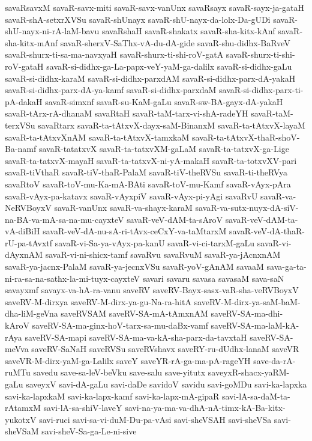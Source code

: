 {savaRsavxM
savaR-savx-miti
savaR-savx-vanUnx
savaRsayx
savaR-sayx-ja-gataH
savaR-shA-setxrXVSu
savaR-shUnayx
savaR-shU-nayx-da-lolx-Da-gUDi
savaR-shU-nayx-ni-rA-laM-bavu
savaRshaH
savaR-shakatx
savaR-sha-kitx-kAnf
savaR-sha-kitx-mAnf
savaR-sherxV-SaThx-vA-du-dA-gide
savaR-shu-didhx-BaRveV
savaR-shurx-ti-sa-ma-navxyaH
savaR-shurx-ti-shi-roV-gatA
savaR-shurx-ti-shi-roV-gataH
savaR-si-didhx-ga-La-papx-veY-yaM-ga-dalilx
savaR-si-didhx-gaLu
savaR-si-didhx-karaM
savaR-si-didhx-parxdAM
savaR-si-didhx-parx-dA-yakaH
savaR-si-didhx-parx-dA-ya-kamf
savaR-si-didhx-parxdaM
savaR-si-didhx-parx-ti-pA-dakaH
savaR-simxnf
savaR-su-KaM-gaLu
savaR-sw-BA-gayx-dA-yakaH
savaR-tArx-rA-dhanaM
savaRtaH
savaR-taM-tarx-vi-shA-radeYH
savaR-taM-terxVSu
savaRtarx
savaR-ta-tAtxvX-dayx-saM-BinanxM
savaR-ta-tAtxvX-layaM
savaR-ta-tAtxvXnAM
savaR-ta-tAtxvX-tamxkaM
savaR-ta-tAtxvX-thaR-shoV-Ba-namf
savaR-tatatxvX
savaR-ta-tatxvXM-gaLaM
savaR-ta-tatxvX-ga-Lige
savaR-ta-tatxvX-mayaH
savaR-ta-tatxvX-ni-yA-makaH
savaR-ta-totxvXV-pari
savaR-tiVthaR
savaR-tiV-thaR-PalaM
savaR-tiV-theRVSu
savaR-ti-theRVya
savaRtoV
savaR-toV-mu-Ka-mA-BAti
savaR-toV-mu-Kamf
savaR-vAyx-pAra
savaR-vAyx-pa-katavx
savaR-vAyxpiV
savaR-vAyx-pi-yAgi
savaRvU
savaR-va-NeRVBoyxV
savaR-vanUnx
savaR-va-shayx-karaM
savaR-va-sutx-nuyx-dA-siV-na-BA-va-mA-sa-na-mu-cayxteV
savaR-veV-dAM-ta-sAroV
savaR-veV-dAM-ta-vA-diBiH
savaR-veV-dA-nu-sA-ri-tAvx-ceCxY-va-taMtarxM
savaR-veV-dA-thaR-rU-pa-tAvxtf
savaR-vi-Sa-ya-vAyx-pa-kanU
savaR-vi-ci-tarxM-gaLu
savaR-vi-dAyxnAM
savaR-vi-ni-shicx-tamf
savaRvu
savaRvuM
savaR-ya-jAcnxnAM
savaR-ya-jacnx-PalaM
savaR-ya-jecnxVSu
savaR-yoV-gAnAM
savaaM
sava-ga-ta-ni-ra-sa-na-sathx-la-mi-tuyx-cayxteV
savari
savaru
savasa
savasaM
sava-saN
savayxmf
savayx-va-hA-ra-vanu
saveRV
saveRV-Bayx-sasx-vaR-sha-veRVBoyxV
saveRV-M-dirxya
saveRV-M-dirx-ya-gu-Na-ra-hitA
saveRV-M-dirx-ya-saM-baM-dha-liM-geVna
saveRVSAM
saveRV-SA-mA-tAmxnAM
saveRV-SA-ma-dhi-kAroV
saveRV-SA-ma-ginx-hoV-tarx-sa-mu-daBx-vamf
saveRV-SA-ma-laM-kA-rAya
saveRV-SA-mapi
saveRV-SA-ma-va-kA-sha-parx-da-tavxtaH
saveRV-SA-meVva
saveRV-SaNaH
saveRVSu
saveRVshavx
saveRY-ru-dUdhx-lanaM
saveVR
saveVR-M-dirx-yaM-ga-Lalilx
saveY
saveYR-rA-ga-ma-pA-rageYH
save-da-rA-ruMTu
savedu
save-sa-leV-beVku
save-salu
save-yitutx
saveyxR-shacx-yaRM-gaLu
saveyxV
savi-dA-gaLu
savi-daDe
savidoV
savidu
savi-goMDu
savi-ka-lapxka
savi-ka-lapxkaM
savi-ka-lapx-kamf
savi-ka-lapx-mA-gipaR
savi-lA-sa-daM-ta-rAtamxM
savi-lA-sa-shiV-laveY
savi-na-ya-ma-va-dhA-nA-timx-kA-Ba-kitx-yukotxV
savi-ruci
savi-sa-vi-duM-Du-pa-vAsi
savi-sheVSAH
savi-sheVSa
savi-sheVSaM
savi-sheV-Sa-ga-Le-ni-sive
}
